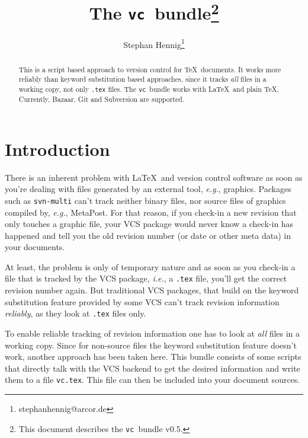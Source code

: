 \documentclass[11pt]{article}
\newcommand*{\pkg}{\texttt{vc}}
\begin{document}
\author{Stephan Hennig\thanks{stephanhennig@arcor.de}}
\title{The \pkg\ bundle\thanks{This document describes the \pkg\ bundle
    v0.5.}}
\maketitle
\begin{abstract}
  This is a script based approach to version control for \TeX\
  documents.  It works more reliably than keyword substitution based
  approaches, since it tracks \emph{all} files in a working copy, not
  only \texttt{.tex} files.  The \pkg\ bundle works with \LaTeX\ and
  plain \TeX.  Currently, Bazaar, Git and Subversion are supported.
\end{abstract}
\begin{multicols}{2}
\tableofcontents
\end{multicols}



\section{Introduction}
There is an inherent problem with \LaTeX\ and version control software
as soon as you're dealing with files generated by an external tool,
\emph{e.g.}, graphics.  Packages such as \texttt{svn-multi} can't track
neither binary files, nor source files of graphics compiled by,
\emph{e.g.}, MetaPost.  For that reason, if you check-in a new revision
that only touches a graphic file, your VCS package would never know a
check-in has happened and tell you the old revision number (or date or
other meta data) in your documents.

At least, the problem is only of temporary nature and as soon as you
check-in a file that is tracked by the VCS package, \emph{i.e.}, a
\texttt{.tex} file, you'll get the correct revision number again.  But
traditional VCS packages, that build on the keyword substitution feature
provided by some VCS can't track revision information \emph{reliably},
as they look at \texttt{.tex} files only.

To enable reliable tracking of revision information one has to look at
\emph{all} files in a working copy.  Since for non-source files the
keyword substitution feature doesn't work, another approach has been
taken here.  This bundle consists of some scripts that directly talk
with the VCS backend to get the desired information and write them to a
file \texttt{vc.tex}.  This file can then be included into your document
sources.
\end{document}
